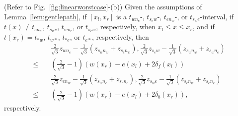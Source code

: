 \begin{lemma}
\label{lem:softrecovery}
(Refer to Fig.~\ref{fig:linearworstcase}-(b)) 
Given the assumptions of Lemma~\ref{lem:gentlepath}, 
if $[x_l,x_r]$ is a $t_{wn_e}$-, $t_{s_ew}$-, $t_{en_w}$-, or $t_{s_we}$-interval,
if $t(x) \not= t_{en_w}$, $t_{s_we}$, $t_{wn_e}$, or $t_{s_ew}$, respectively, when
$x_l \leq x \leq x_r$, and if $t(x_r) = t_{\ast w}$, $t_{w \ast}$, $t_{\ast e}$,
or $t_{e \ast}$, respectively, then
\begin{align}
& \quad \frac{2}{\sqrt{3}}z_{wn_e} - \frac{1}{\sqrt{3}}(z_{s_wn_w}+z_{s_en_w}), 
\frac{2}{\sqrt{3}}z_{s_ew} - \frac{1}{\sqrt{3}}(z_{s_wn_w}+z_{s_wn_e})  \nonumber \\
\leq & \quad \left(\frac{2}{\sqrt{3}}-1\right)(w(x_r) - e(x_l) + 2\delta_f(x_l)) \label{eq:softrecovery} \\
& \quad \frac{2}{\sqrt{3}}z_{en_w} - \frac{1}{\sqrt{3}}(z_{s_wn_e}+z_{s_en_e}),
\frac{2}{\sqrt{3}}z_{s_we} - \frac{1}{\sqrt{3}}(z_{s_en_w}+z_{s_en_e}) \nonumber \\
\leq & \quad \left(\frac{2}{\sqrt{3}}-1\right)(w(x_r) - e(x_l) + 2\delta_b(x_r)), \nonumber
\end{align}
respectively.
\end{lemma}

